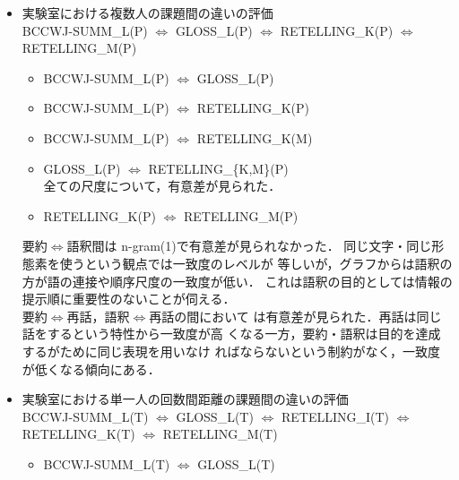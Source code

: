 \documentclass[japanese]{jnlp_1.4}
\newcommand{\modified}[1]{}
\begin{document}
\begin{itemize}
  \item 実験室における複数人の課題間の違いの評価 \\
	BCCWJ-SUMM\_L(P) $\Leftrightarrow$ GLOSS\_L(P) $\Leftrightarrow$
	RETELLING\_K(P) $\Leftrightarrow$ RETELLING\_M(P) 
	\begin{itemize}
	 \item BCCWJ-SUMM\_L(P) $\Leftrightarrow$ GLOSS\_L(P) \\
\modified{文字単位の評価の場合 n-gram(2,3,4)\_char に
	       有意差が見られた．\\
	       形態素単位の評価の場合
	       n-gram(2,3,4)\_mrph に有意差が見られた．}
	 \item BCCWJ-SUMM\_L(P) $\Leftrightarrow$ RETELLING\_K(P) \\
\modified{n-gram(4)\_char, n-gram(3,4)\_mrph 以外で有意差が見られた．}
	 \item BCCWJ-SUMM\_L(P) $\Leftrightarrow$ RETELLING\_K(M) \\
\modified{n-gram(4)\_mrph 以外で有意差が見られた．}
	 \item GLOSS\_L(P) $\Leftrightarrow$ RETELLING\_\{K,M\}(P)\\
	       全ての尺度について，有意差が見られた．
	 \item RETELLING\_K(P) $\Leftrightarrow$ RETELLING\_M(P)\\
	       \modified{全ての尺度について，有意差が見られなかった．}
	\end{itemize}
	要約$\Leftrightarrow$語釈間は n-gram(1)で有意差が見られなかった．
	同じ文字・同じ形態素を使うという観点では一致度のレベルが
	等しいが，\modified{語の連接が入ると有意差が見られることがわかっ
	た．}グラフからは語釈の方が語の連接や順序尺度の一致度が低い．
これは語釈の目的としては情報の提示順に重要性のないことが伺える．\\
	要約$\Leftrightarrow$再話，語釈$\Leftrightarrow$再話の間において
	は有意差が見られた．再話は同じ話をするという特性から一致度が高
	くなる一方，要約・語釈は目的を達成するがために同じ表現を用いなけ
	ればならないという制約がなく，一致度が低くなる傾向にある．
	\modified{また同一課題の語釈間では有意差はなかった．}
  \item 実験室における単一人の回数間距離の課題間の違いの評価 \\
	BCCWJ-SUMM\_L(T) $\Leftrightarrow$ GLOSS\_L(T) $\Leftrightarrow$
	RETELLING\_I(T) $\Leftrightarrow$ RETELLING\_K(T)
	$\Leftrightarrow$ RETELLING\_M(T)
	\begin{itemize}
	 \item BCCWJ-SUMM\_L(T) $\Leftrightarrow$ GLOSS\_L(T) \\

\end{itemize}
\end{itemize}
\end{document}
